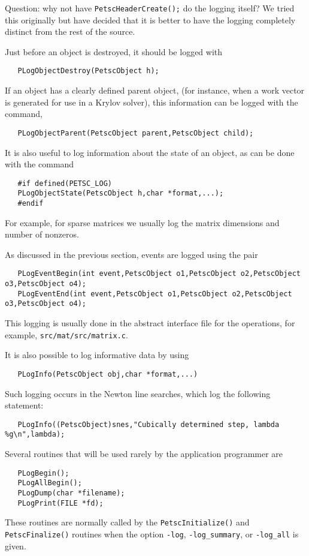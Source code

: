 \begin{design}
Question:
why not have {\tt PetscHeaderCreate();} do the logging itself? We tried
this originally but have decided that it is better to have the logging
completely distinct from the rest of the source.
\end{design}

Just before an object is destroyed, it should be logged
with  
\begin{verbatim}
   PLogObjectDestroy(PetscObject h);
\end{verbatim}

If an object has a clearly defined parent object, (for instance, when 
a work vector is generated for use in a Krylov solver), this information
can be logged with the command, 
\begin{verbatim}
   PLogObjectParent(PetscObject parent,PetscObject child);
\end{verbatim}
It is also useful to log information about the state of an object, as can
be done with the command 
\begin{verbatim}
   #if defined(PETSC_LOG)
   PLogObjectState(PetscObject h,char *format,...);
   #endif
\end{verbatim}
For example, for sparse matrices we usually log the matrix 
dimensions and number of nonzeros.

As discussed in the previous section, events are logged using the 
pair 
\begin{verbatim}
   PLogEventBegin(int event,PetscObject o1,PetscObject o2,PetscObject o3,PetscObject o4);
   PLogEventEnd(int event,PetscObject o1,PetscObject o2,PetscObject o3,PetscObject o4);
\end{verbatim}
This logging is usually done in the abstract
interface file for the operations, for example, {\tt src/mat/src/matrix.c}.

It is also possible to log informative data by using 
\begin{verbatim}
   PLogInfo(PetscObject obj,char *format,...)
\end{verbatim}
Such logging occurs in the Newton line searches, which log the following 
statement:
\begin{verbatim}
   PLogInfo((PetscObject)snes,"Cubically determined step, lambda %g\n",lambda);
\end{verbatim}

Several routines that will be used rarely by the 
application programmer 
are    
\begin{verbatim}
   PLogBegin();
   PLogAllBegin();
   PLogDump(char *filename);
   PLogPrint(FILE *fd);
\end{verbatim}
These routines are normally called by the {\tt PetscInitialize()}
and {\tt PetscFinalize()} routines when the option {\tt -log}, 
{\tt -log\_summary}, or 
{\tt -log\_all} is given.

